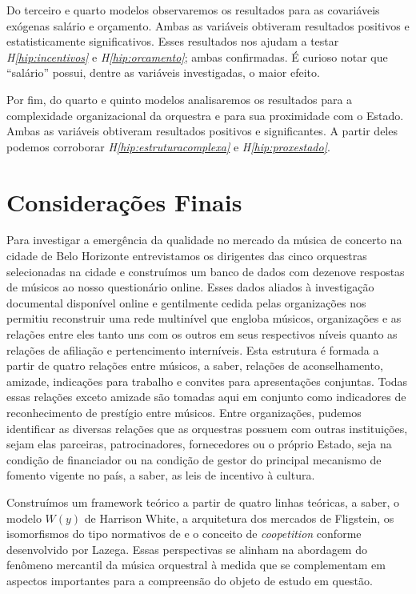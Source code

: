 \documentclass[a4paper, 12pt, openright, oneside, german, french, english, brazil]{abntex2}
\begin{document}
	Do terceiro e quarto modelos observaremos os resultados para as covariáveis exógenas salário e orçamento. Ambas as variáveis obtiveram resultados positivos e estatisticamente significativos. Esses resultados nos ajudam a testar \textit{H\ref{hip:incentivos}} e \textit{H\ref{hip:orcamento}}; ambas confirmadas. É curioso notar que ``salário'' possui, dentre as variáveis investigadas, o maior efeito. 
			
	Por fim, do quarto e quinto modelos analisaremos os resultados para a complexidade organizacional da orquestra e para sua proximidade com o Estado. Ambas as variáveis obtiveram resultados positivos e significantes. A partir deles podemos corroborar \textit{H\ref{hip:estruturacomplexa}} e \textit{H\ref{hip:proxestado}}.

	
	\chapter{Considerações Finais}

	Para investigar a emergência da qualidade no mercado da música de concerto na cidade de Belo Horizonte entrevistamos os dirigentes das cinco orquestras selecionadas na cidade e construímos um banco de dados com dezenove respostas de músicos ao nosso questionário online. Esses dados aliados à investigação documental disponível online e gentilmente cedida pelas organizações nos permitiu reconstruir uma rede multinível que engloba músicos, organizações e as relações entre eles tanto uns com os outros em seus respectivos níveis quanto as relações de afiliação e pertencimento interníveis. Esta estrutura é formada a partir de quatro relações entre músicos, a saber, relações de aconselhamento, amizade, indicações para trabalho e convites para apresentações conjuntas. Todas essas relações exceto amizade são tomadas aqui em conjunto como indicadores de reconhecimento de prestígio entre músicos. Entre organizações, pudemos identificar as diversas relações que as orquestras possuem com outras instituições, sejam elas parceiras, patrocinadores, fornecedores ou o próprio Estado, seja na condição de financiador ou na condição de gestor do principal mecanismo de fomento vigente no país, a saber, as leis de incentivo à cultura.
	
	Construímos um framework teórico a partir de quatro linhas teóricas, a saber, o modelo $W(y)$ de Harrison White, a arquitetura dos mercados de Fligstein, os isomorfismos do tipo normativos de  e o conceito de \textit{coopetition} conforme desenvolvido por Lazega. Essas perspectivas se alinham na abordagem do fenômeno mercantil da música orquestral à medida que se complementam em aspectos importantes para a compreensão do objeto de estudo em questão.
	
\end{document}

